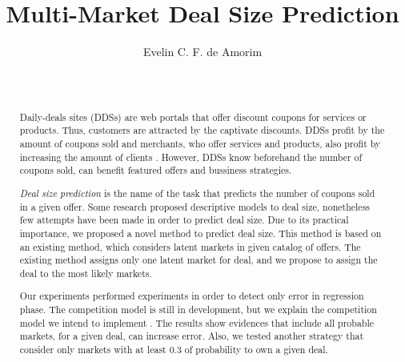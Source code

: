 \documentclass{acm_proc_article-sp}
\begin{document}
\title{Multi-Market Deal Size Prediction}


%
\author{
\alignauthor
Evelin C. F. de Amorim \\
       \\
       \\
}

\maketitle
\begin{abstract}

Daily-deals sites (DDSs) are web portals that offer discount coupons for services 
or products. Thus, customers are attracted by the captivate discounts. 
DDSs profit by the amount of coupons sold and  merchants, who offer  
services and products, also profit by increasing the amount of clients 
. However, DDSs know 
beforehand the number of coupons sold, can benefit featured offers and 
bussiness strategies.

\emph{Deal size prediction} is the name of the task that predicts the number 
of coupons sold in a given offer. Some research proposed descriptive models 
to deal size, nonetheless few attempts have been made in order to 
predict deal size. Due to its practical importance, we proposed a 
novel method to predict deal size. This method is based on an existing method, 
which considers latent markets in given catalog of offers. The existing method 
assigns only one latent market for deal, and we propose to 
assign the deal to the most likely markets.

Our experiments performed experiments in order to detect 
only error in regression phase. The competition model is still in 
development, but we explain the competition model we intend to 
implement
. The results show evidences that include all probable markets,  
for a given deal, can increase error. Also, we tested another strategy that 
consider only markets with at least 0.3 of probability to own a given deal.

\end{abstract}

\end{document}
